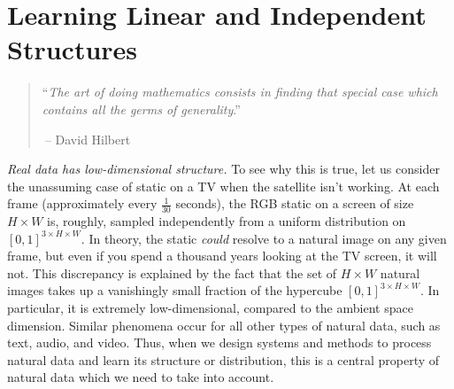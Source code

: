 \documentclass[../../book-main.tex]{subfiles}
\begin{document}
\chapter{Learning Linear and Independent Structures}
\label{ch:classic}\label{ch:linear-independent}

\begin{quote}
\hfill  ``{\em The art of doing mathematics consists in finding that special case which contains all the germs of generality}.''

$~$\hfill -- David Hilbert
\end{quote}
\vspace{5mm}







\textit{Real data has low-dimensional structure.} To see why this is true, let us consider the unassuming case of static on a TV when the satellite isn't working. At each frame (approximately every \(\frac{1}{30}\) seconds), the RGB static on a screen of size \(H \times W\) is, roughly, sampled independently from a uniform distribution on \([0, 1]^{3 \times H \times W}\). In theory, the static \textit{could} resolve to a natural image on any given frame, but even if you spend a thousand years looking at the TV screen, it will not. This discrepancy is explained by the fact that the set of \(H \times W\) natural images takes up a vanishingly small fraction of the hypercube \([0, 1]^{3 \times H \times W}\). In particular, it is extremely low-dimensional, compared to the ambient space dimension. Similar phenomena occur for all other types of natural data, such as text, audio, and video. Thus, when we design systems and methods to process natural data and learn its structure or distribution, this is a central property of natural data which we need to take into account. %
\end{document}
